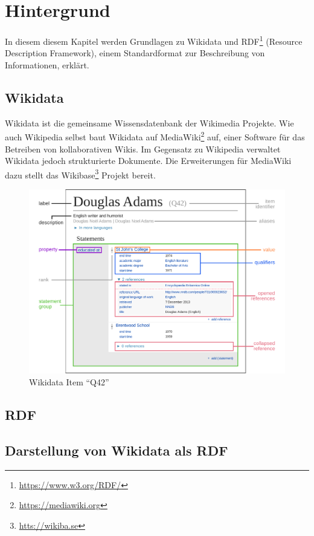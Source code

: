 %
\chapter{Hintergrund}
\label{sec:concepts}
In diesem diesem Kapitel werden Grundlagen zu Wikidata und RDF\footnote{\url{https://www.w3.org/RDF/}} (Resource Description Framework), einem Standardformat zur Beschreibung von Informationen, erklärt. 

\section{Wikidata}
Wikidata ist die gemeinsame Wissensdatenbank der Wikimedia Projekte.
Wie auch Wikipedia selbst baut Wikidata auf MediaWiki\footnote{\url{https://mediawiki.org}} auf, einer Software für das Betreiben von kollaborativen Wikis.
Im Gegensatz zu Wikipedia verwaltet Wikidata jedoch strukturierte Dokumente.
Die Erweiterungen für MediaWiki dazu stellt das Wikibase\footnote{\url{htts://wikiba.se}} Projekt bereit.


\begin{figure}
  \includegraphics[width=\linewidth]{pics/Datamodel_in_Wikidata}
  \caption{Wikidata Item ``Q42''}
  \label{fig:wd-datamodel}
\end{figure}

\section{RDF}

\section{Darstellung von Wikidata als RDF}